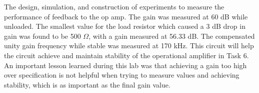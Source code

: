 
The design, simulation, and construction of experiments to measure the performance of feedback to the op amp.  The gain was measured at 60 dB while unloaded. The smallest value for the load resistor which caused a 3 dB drop in gain was found to be 500 $\Omega$, with a gain measured at 56.33 dB. The  compensated unity gain frequency while stable was measured at 170 kHz. This circuit will help the circuit achieve and maintain stability of the operational amplifier in Task 6.  An important lesson learned during this lab was that achieving a gain too high over specification is not helpful when trying to measure values and achieving stability, which is as important as the final gain value.



